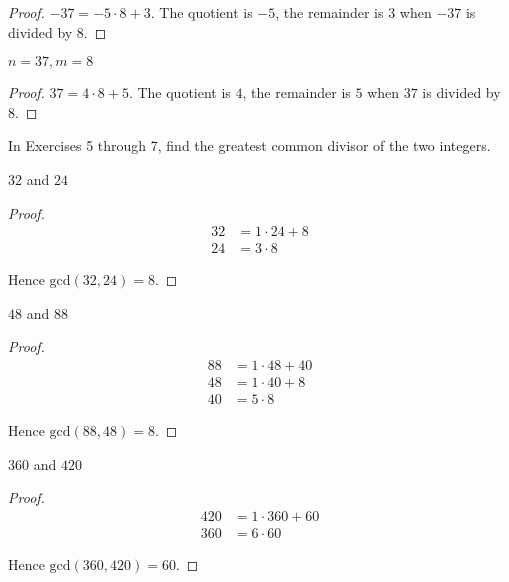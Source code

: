 \begin{proof}
    $-37 = -5\cdot 8 + 3$. The quotient is $-5$, the remainder is $3$ when $-37$ is divided by $8$.
\end{proof}

\newpage
\begin{exercise}
    $n = 37, m = 8$
\end{exercise}

\begin{proof}
    $37 = 4\cdot 8 + 5$. The quotient is $4$, the remainder is $5$ when $37$ is divided by $8$.
\end{proof}

In Exercises 5 through 7, find the greatest common divisor of the two integers.

\newpage
\begin{exercise}
    $32$ and $24$
\end{exercise}

\begin{proof}
    \begin{align*}
        32 & = 1\cdot 24 + 8 \\
        24 & = 3\cdot 8
    \end{align*}

    Hence $\text{gcd}(32, 24) = 8$.
\end{proof}

\newpage
\begin{exercise}
    $48$ and $88$
\end{exercise}

\begin{proof}
    \begin{align*}
        88 & = 1\cdot 48 + 40 \\
        48 & = 1\cdot 40 + 8  \\
        40 & = 5\cdot 8
    \end{align*}

    Hence $\text{gcd}(88, 48) = 8$.
\end{proof}

\newpage
\begin{exercise}
    $360$ and $420$
\end{exercise}

\begin{proof}
    \begin{align*}
        420 & = 1\cdot 360 + 60 \\
        360 & = 6\cdot 60
    \end{align*}

    Hence $\text{gcd}(360, 420) = 60$.
\end{proof}

